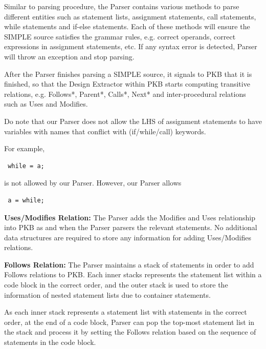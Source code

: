 \documentclass[12pt]{article}
\begin{document}
Similar to parsing procedure, the Parser contains various methods to parse different entities such as statement lists, assignment statements, call statements, while statements and if-else statements. Each of these methods will ensure the SIMPLE source satisfies the grammar rules, e.g. correct operands, correct expressions in assignment statements, etc. If any syntax error is detected, Parser will throw an exception and stop parsing.

After the Parser finishes parsing a SIMPLE source, it signals to PKB that it is finished, so that the Design Extractor within PKB starts computing transitive relations, e.g. Follows*, Parent*, Calls*, Next* and inter-procedural relations such as Uses and Modifies.

Do note that our Parser does not allow the LHS of assignment statements to have variables with names that conflict with (if/while/call) keywords. 

For example, \begin{verbatim} while = a; \end{verbatim}
is not allowed by our Parser. 
However, our Parser allows \begin{verbatim} a = while; \end{verbatim}
\textbf{Uses/Modifies Relation:} The Parser adds the Modifies and Uses relationship into PKB as and when the Parser parsers the relevant statements. No additional data structures are required to store any information for adding Uses/Modifies relations.

\textbf{Follows Relation:} The Parser maintains a stack of statements in order to add Follows relations to PKB. Each inner stacks represents the statement list within a code block in the correct order, and the outer stack is used to store the information of nested statement lists due to container statements.

As each inner stack represents a statement list with statements in the correct order, at the end of a code block, Parser can pop the top-most statement list in the stack and process it by setting the Follows relation based on the sequence of statements in the code block. \newline
\end{document}
